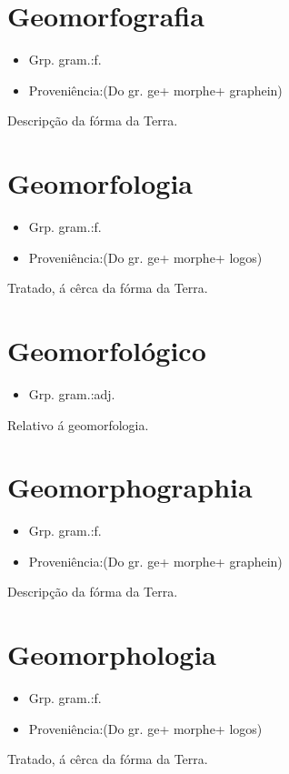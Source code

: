 \section{Geomorfografia}
\begin{itemize}
\item {Grp. gram.:f.}
\end{itemize}
\begin{itemize}
\item {Proveniência:(Do gr. \textunderscore ge\textunderscore  + \textunderscore morphe\textunderscore  + \textunderscore graphein\textunderscore )}
\end{itemize}
Descripção da fórma da Terra.
\section{Geomorfologia}
\begin{itemize}
\item {Grp. gram.:f.}
\end{itemize}
\begin{itemize}
\item {Proveniência:(Do gr. \textunderscore ge\textunderscore  + \textunderscore morphe\textunderscore  + \textunderscore logos\textunderscore )}
\end{itemize}
Tratado, á cêrca da fórma da Terra.
\section{Geomorfológico}
\begin{itemize}
\item {Grp. gram.:adj.}
\end{itemize}
Relativo á geomorfologia.
\section{Geomorphographia}
\begin{itemize}
\item {Grp. gram.:f.}
\end{itemize}
\begin{itemize}
\item {Proveniência:(Do gr. \textunderscore ge\textunderscore  + \textunderscore morphe\textunderscore  + \textunderscore graphein\textunderscore )}
\end{itemize}
Descripção da fórma da Terra.
\section{Geomorphologia}
\begin{itemize}
\item {Grp. gram.:f.}
\end{itemize}
\begin{itemize}
\item {Proveniência:(Do gr. \textunderscore ge\textunderscore  + \textunderscore morphe\textunderscore  + \textunderscore logos\textunderscore )}
\end{itemize}
Tratado, á cêrca da fórma da Terra.
